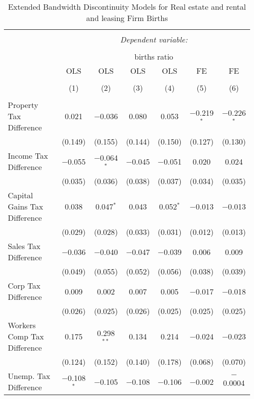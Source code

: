 
\begin{table}[!htbp] \centering 
  \caption{Extended Bandwidth Discontinuity Models for  Real estate and rental and leasing Firm Births} 
  \label{53eb} 
\begin{tabular}{@{\extracolsep{5pt}}lcccccc} 
\\[-1.8ex]\hline 
\hline \\[-1.8ex] 
 & \multicolumn{6}{c}{\textit{Dependent variable:}} \\ 
\cline{2-7} 
\\[-1.8ex] & \multicolumn{6}{c}{births ratio} \\ 
 & OLS & OLS & OLS & OLS & FE & FE \\ 
\\[-1.8ex] & (1) & (2) & (3) & (4) & (5) & (6)\\ 
\hline \\[-1.8ex] 
 Property Tax Difference & 0.021 & $-$0.036 & 0.080 & 0.053 & $-$0.219$^{*}$ & $-$0.226$^{*}$ \\ 
  & (0.149) & (0.155) & (0.144) & (0.150) & (0.127) & (0.130) \\ 
  Income Tax Difference & $-$0.055 & $-$0.064$^{*}$ & $-$0.045 & $-$0.051 & 0.020 & 0.024 \\ 
  & (0.035) & (0.036) & (0.038) & (0.037) & (0.034) & (0.035) \\ 
  Capital Gains Tax Difference & 0.038 & 0.047$^{*}$ & 0.043 & 0.052$^{*}$ & $-$0.013 & $-$0.013 \\ 
  & (0.029) & (0.028) & (0.033) & (0.031) & (0.012) & (0.013) \\ 
  Sales Tax Difference & $-$0.036 & $-$0.040 & $-$0.047 & $-$0.039 & 0.006 & 0.009 \\ 
  & (0.049) & (0.055) & (0.052) & (0.056) & (0.038) & (0.039) \\ 
  Corp Tax Difference & 0.009 & 0.002 & 0.007 & 0.005 & $-$0.017 & $-$0.018 \\ 
  & (0.026) & (0.025) & (0.026) & (0.025) & (0.025) & (0.025) \\ 
  Workers Comp Tax Difference & 0.175 & 0.298$^{**}$ & 0.134 & 0.214 & $-$0.024 & $-$0.023 \\ 
  & (0.124) & (0.152) & (0.140) & (0.178) & (0.068) & (0.070) \\ 
  Unemp. Tax Difference & $-$0.108$^{*}$ & $-$0.105 & $-$0.108 & $-$0.106 & $-$0.002 & $-$0.0004 \\ 

\end{tabular}
\end{table}
